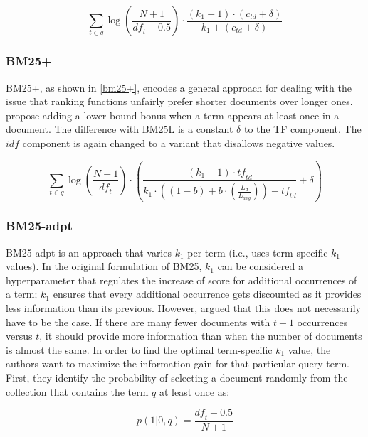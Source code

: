 \begin{equation}
	\label{bm25l}
	\sum_{t\in q} \log\left(\frac{N+1}{\mathit{df}_t + 0.5}\right)\cdot\frac{(k_1 + 1)\cdot(c_{\mathit{td}} + \delta)}{k_1 + (c_{\mathit{td}} + \delta)}
\end{equation}

\subsubsection{BM25+~\citep{bm25+}}
BM25+, as shown in \cref{bm25+}, encodes a general approach for dealing with the issue that ranking functions unfairly prefer shorter documents over longer ones.  propose adding a lower-bound bonus when a term appears at least once in a document. The difference with BM25L is a constant $\delta$ to the TF component. The $\mathit{idf}$ component is again changed to a variant that disallows negative values.

\begin{equation}
	\label{bm25+}
	\sum_{t\in q} \log\left(\frac{N+1}{\mathit{df}_t}\right)\cdot\left(\frac{\left(k_1 + 1\right)\cdot \mathit{tf}_{\mathit{td}}}{k_1\cdot\left(\left(1-b\right)+b\cdot\left(\frac{L_d}{L_{\mathit{avg}}}\right)\right)+\mathit{tf}_{\mathit{td}}}+\delta\right)
\end{equation}

\subsubsection{BM25-adpt~\citep{bm25-adpt}}
BM25-adpt is an approach that varies $k_1$ per term (i.e., uses term specific $k_1$ values). In the original formulation of BM25, $k_1$ can be considered a hyperparameter that regulates the increase of score for additional occurrences of a term; $k_1$ ensures that every additional occurrence gets discounted as it provides less information than its previous. However, \citeauthor{bm25-adpt} argued that this does not necessarily have to be the case. If there are many fewer documents with $t+1$ occurrences versus $t$, it should provide more information than when the number of documents is almost the same. In order to find the optimal term-specific $k_1$ value, the authors want to maximize the information gain for that particular query term. 
First, they identify the probability of selecting a document randomly from the collection that contains the term $q$ at least once as:

\begin{equation}
	p(1|0,q) = \frac{\mathit{df}_t+0.5}{N+1}
\end{equation}

